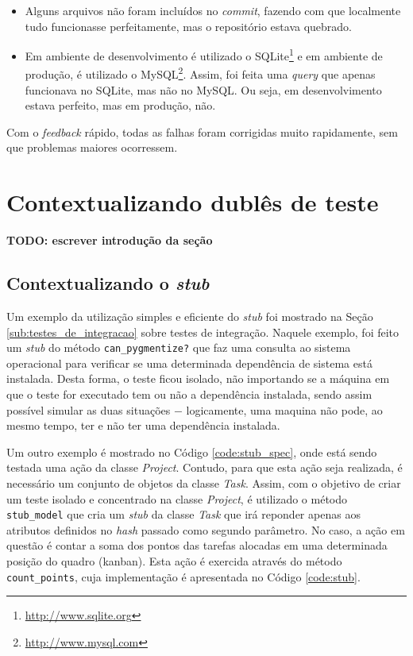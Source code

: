 \begin{itemize}
  \item Alguns arquivos não foram incluídos no \textit{commit}, fazendo com que localmente tudo funcionasse perfeitamente, mas o repositório estava quebrado.
  \item Em ambiente de desenvolvimento é utilizado o SQLite\footnote{\url{http://www.sqlite.org}} e em ambiente de produção, é utilizado o MySQL\footnote{\url{http://www.mysql.com}}. Assim, foi feita uma \textit{query} que apenas funcionava no SQLite, mas não no MySQL. Ou seja, em desenvolvimento estava perfeito, mas em produção, não.
\end{itemize}

Com o \textit{feedback} rápido, todas as falhas foram corrigidas muito rapidamente, sem que problemas maiores ocorressem.


\section{Contextualizando dublês de teste}

\textbf{TODO: escrever introdução da seção}

\subsection{Contextualizando o \textit{stub}}
\label{sub:contextualizando_o_stub}

Um exemplo da utilização simples e eficiente do \textit{stub} foi mostrado na Seção \ref{sub:testes_de_integracao} sobre testes de integração. Naquele exemplo, foi feito um \textit{stub} do método \texttt{can\_pygmentize?} que faz uma consulta ao sistema operacional para verificar se uma determinada dependência de sistema está instalada. Desta forma, o teste ficou isolado, não importando se a máquina em que o teste for executado tem ou não a dependência instalada, sendo assim possível simular as duas situações $-$ logicamente, uma maquina não pode, ao mesmo tempo, ter e não ter uma dependência instalada.

Um outro exemplo é mostrado no Código \ref{code:stub_spec}, onde está sendo testada uma ação da classe \textit{Project}. Contudo, para que esta ação seja realizada, é necessário um conjunto de objetos da classe \textit{Task}. Assim, com o objetivo de criar um teste isolado e concentrado na classe \textit{Project}, é utilizado o método \texttt{stub\_model} que cria um \textit{stub} da classe \textit{Task} que irá reponder apenas aos atributos definidos no \textit{hash} passado como segundo parâmetro. No caso, a ação em questão é contar a soma dos pontos das tarefas alocadas em uma determinada posição do quadro (kanban). Esta ação é exercida através do método \texttt{count\_points}, cuja implementação é apresentada no Código \ref{code:stub}.

